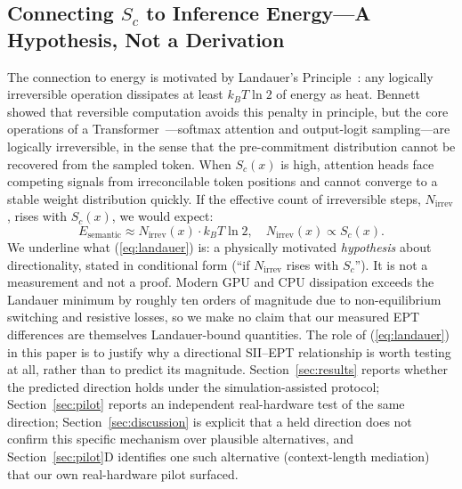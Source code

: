 \documentclass[conference]{IEEEtran}
\begin{document}
\subsection{Connecting $S_c$ to Inference Energy---A Hypothesis, Not a Derivation}
The connection to energy is motivated by Landauer's
Principle~\cite{landauer1961irrev}: any logically irreversible
operation dissipates at least $k_B T \ln 2$ of energy as heat.
Bennett~\cite{bennett1982thermo} showed that reversible computation
avoids this penalty in principle, but the core operations of a
Transformer~\cite{vaswani2017attention}---softmax attention and
output-logit sampling---are logically irreversible, in the sense that
the pre-commitment distribution cannot be recovered from the sampled
token. When $S_c(x)$ is high, attention heads face competing signals
from irreconcilable token positions and cannot converge to a stable
weight distribution quickly. If the effective count of irreversible
steps, $N_\text{irrev}$, rises with $S_c(x)$, we would expect:
\begin{equation}
  E_\text{semantic} \approx N_\text{irrev}(x) \cdot k_B T \ln 2,
  \quad N_\text{irrev}(x) \propto S_c(x).
  \label{eq:landauer}
\end{equation}
We underline what (\ref{eq:landauer}) is: a physically motivated
\emph{hypothesis} about directionality, stated in conditional form
(``if $N_\text{irrev}$ rises with $S_c$''). It is not a measurement
and not a proof. Modern GPU and CPU dissipation exceeds the Landauer
minimum by roughly ten orders of magnitude due to non-equilibrium
switching and resistive losses, so we make no claim that our measured
EPT differences are themselves Landauer-bound quantities. The role of
(\ref{eq:landauer}) in this paper is to justify why a directional
SII--EPT relationship is worth testing at all, rather than to
predict its magnitude. Section~\ref{sec:results} reports whether the
predicted direction holds under the simulation-assisted protocol;
Section~\ref{sec:pilot} reports an independent real-hardware test of
the same direction; Section~\ref{sec:discussion} is explicit that a
held direction does not confirm this specific mechanism over plausible
alternatives, and Section~\ref{sec:pilot}D identifies one such
alternative (context-length mediation) that our own real-hardware
pilot surfaced.
\end{document}

